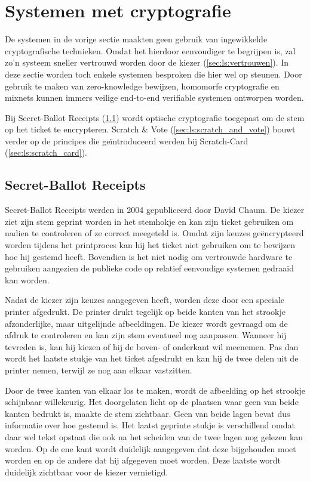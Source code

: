\section{Systemen met cryptografie}

De systemen in de vorige sectie maakten geen gebruik van ingewikkelde cryptografische technieken. Omdat het hierdoor eenvoudiger te begrijpen is, zal zo'n systeem sneller vertrouwd worden door de kiezer (\ref{sec:ls:vertrouwen}). In deze sectie worden toch enkele systemen besproken die hier wel op steunen. Door gebruik te maken van zero-knowledge bewijzen, homomorfe cryptografie en mixnets kunnen immers veilige end-to-end verifiable systemen ontworpen worden.

\npar Bij Secret-Ballot Receipts (\ref{sec:ls:secret_ballot_receipts}) wordt optische cryptografie toegepast om de stem op het ticket te encrypteren. Scratch \& Vote (\ref{sec:ls:scratch_and_vote}) bouwt verder op de principes die geïntroduceerd werden bij Scratch-Card (\ref{sec:ls:scratch_card}).

\subsection{Secret-Ballot Receipts~\cite{chaum_secret_ballot}}
\label{sec:ls:secret_ballot_receipts}

Secret-Ballot Receipts werden in 2004 gepubliceerd door David Chaum. De kiezer ziet zijn stem geprint worden in het stemhokje en kan zijn ticket gebruiken om nadien te controleren of ze correct meegeteld is. Omdat zijn keuzes ge\"encrypteerd worden tijdens het printproces kan hij het ticket niet gebruiken om te bewijzen hoe hij gestemd heeft. Bovendien is het niet nodig om vertrouwde hardware te gebruiken aangezien de publieke code op relatief eenvoudige systemen gedraaid kan worden.

\npar Nadat de kiezer zijn keuzes aangegeven heeft, worden deze door een speciale printer afgedrukt. De printer drukt tegelijk op beide kanten van het strookje afzonderlijke, maar uitgelijnde afbeeldingen. De kiezer wordt gevraagd om de afdruk te controleren en kan zijn stem eventueel nog aanpassen. Wanneer hij tevreden is, kan hij kiezen of hij de boven- of onderkant wil meenemen. Pas dan wordt het laatste stukje van het ticket afgedrukt en kan hij de twee delen uit de printer nemen, terwijl ze nog aan elkaar vastzitten.

\npar Door de twee kanten van elkaar los te maken, wordt de afbeelding op het strookje schijnbaar willekeurig. Het doorgelaten licht op de plaatsen waar geen van beide kanten bedrukt is, maakte de stem zichtbaar. Geen van beide lagen bevat dus informatie over hoe gestemd is. Het laatst geprinte stukje is verschillend omdat daar wel tekst opstaat die ook na het scheiden van de twee lagen nog gelezen kan worden. Op de ene kant wordt duidelijk aangegeven dat deze bijgehouden moet worden en op de andere dat hij afgegeven moet worden. Deze laatste wordt duidelijk zichtbaar voor de kiezer vernietigd.

